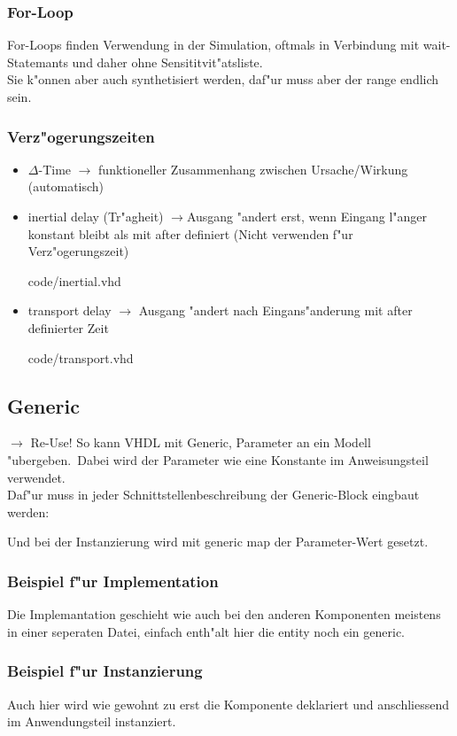 		\begin{multicols}{2}
			\subsubsection{For-Loop} %
				For-Loops finden Verwendung in der Simulation, oftmals in Verbindung 
				mit wait-Statemants und daher ohne Sensititvit"atsliste.\\
				Sie k"onnen aber auch synthetisiert werden, daf"ur muss aber der range 
				endlich sein.
				
			\subsubsection{Verz"ogerungszeiten}  %
				\begin{itemize}
					\item $\Delta$-Time $\rightarrow$ funktioneller Zusammenhang 
						zwischen Ursache/Wirkung (automatisch)
					\item inertial delay (Tr"agheit) $\rightarrow$Ausgang "andert erst, 
						wenn Eingang l"anger konstant bleibt als mit after definiert 
						(Nicht verwenden f"ur Verz"ogerungszeit)
						
							{code/inertial.vhd}
					\item transport delay $\rightarrow$ Ausgang "andert nach 
						Eingans"anderung mit after definierter Zeit 
						
							{code/transport.vhd}
				\end{itemize}
		\end{multicols}

	\subsection{Generic}
		$\rightarrow$ Re-Use! So kann VHDL mit Generic, Parameter an ein Modell 
		"ubergeben.\ Dabei wird der Parameter wie eine Konstante im Anweisungsteil 
		verwendet.\\
		Daf"ur muss in jeder Schnittstellenbeschreibung der Generic-Block eingbaut werden:
		
		Und bei der Instanzierung wird mit generic map der Parameter-Wert gesetzt.
		\begin{multicols}{2}
			\subsubsection{Beispiel f"ur Implementation}
				Die Implemantation geschieht wie auch bei den anderen 
				Komponenten meistens in einer seperaten Datei, einfach enth"alt hier die 
				entity noch ein generic.
				
			\subsubsection{Beispiel f"ur Instanzierung}
				Auch hier wird wie gewohnt zu erst die Komponente deklariert und 
				anschliessend im Anwendungsteil instanziert.
				
		\end{multicols}
		
